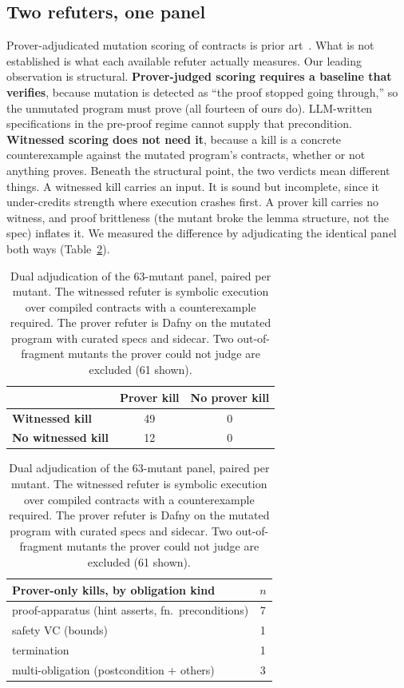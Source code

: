 \documentclass{article}
\begin{document}
\subsection{Two refuters, one panel}

Prover-adjudicated mutation scoring of contracts is prior
art~\cite{knuppel2021,mutdafny}. What is not established is what each
available refuter actually measures. Our leading observation is
structural. \textbf{Prover-judged scoring requires a baseline that
verifies}, because mutation is detected as ``the proof stopped going
through,'' so the unmutated program must prove (all fourteen of ours do).
LLM-written specifications in the pre-proof regime cannot supply that
precondition. \textbf{Witnessed scoring does not need it}, because a kill
is a concrete counterexample against the mutated program's contracts,
whether or not anything proves. Beneath the structural point, the two
verdicts mean different things. A witnessed kill carries an input. It is
sound but incomplete, since it under-credits strength where execution
crashes first. A prover kill carries no witness, and proof brittleness
(the mutant broke the lemma structure, not the spec) inflates it. We
measured the difference by adjudicating the identical panel both ways
(Table~\ref{tab:dual}).

\begin{table}[t]
\centering
\caption{Dual adjudication of the 63-mutant panel, paired per mutant. The
witnessed refuter is symbolic execution over compiled contracts with a
counterexample required. The prover refuter is Dafny on the mutated
program with curated specs and sidecar. Two out-of-fragment mutants the
prover could not judge are excluded (61 shown).}
\label{tab:dual}
\small
\begin{tabular}{lcc}
\toprule
 & \textbf{Prover kill} & \textbf{No prover kill} \\
\midrule
\textbf{Witnessed kill} & 49 & 0 \\
\textbf{No witnessed kill} & 12 & 0 \\
\bottomrule
\end{tabular}
\quad
\begin{tabular}{lc}
\toprule
\textbf{Prover-only kills, by obligation kind} & $n$ \\
\midrule
proof-apparatus (hint asserts, fn.\ preconditions) & 7 \\
safety VC (bounds) & 1 \\
termination & 1 \\
multi-obligation (postcondition $+$ others) & 3 \\
\bottomrule
\end{tabular}
\end{table}
\end{document}
